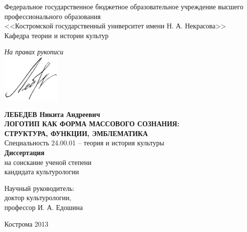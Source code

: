 \thispagestyle{empty}

\begin{center}
  Федеральное государственное бюджетное образовательное учреждение высшего профессионального образования \\
  <<Костромской государственный университет имени Н. А. Некрасова>> \\
  \vspace{1em}
  Кафедра теории и истории культур
\end{center}
\vspace{.1em}
\begin{flushright}
  \textit{На правах рукописи} \\
  \vspace{14pt}
  \includegraphics[width=2.9cm]{images/lebedev}
\end{flushright}
\begin{center}
  \textbf{ЛЕБЕДЕВ Никита Андреевич} \\
  \vspace{3em}
  \textbf{ЛОГОТИП КАК ФОРМА МАССОВОГО СОЗНАНИЯ:\\
    СТРУКТУРА, ФУНКЦИИ, ЭМБЛЕМАТИКА} \\
  \vspace{3em}
  Специальность 24.00.01 – теория и история культуры \\
  \vspace{3em}
  \textbf{Диссертация} \\
  на соискание ученой степени \\
  кандидата культурологии
\end{center}
\vspace{3em}
\begin{flushright}
  Научный руководитель: \\
  доктор культурологии, \\
  профессор И. А. Едошина
\end{flushright}

\vspace{6em}
\begin{center}
  Кострома 2013
\end{center}
